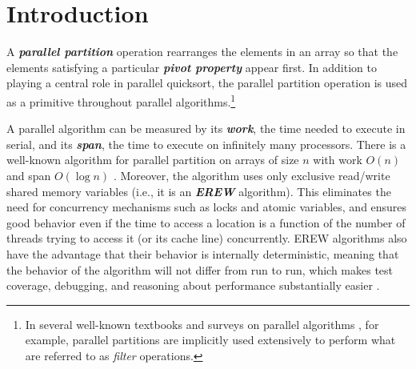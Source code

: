 \documentclass[sigplan, 10pt, nonacm]{acmart}
\newcommand{\defn}[1]{{\textit{\textbf{\boldmath #1}}}}
\theoremstyle{remark}
\theoremstyle{remark}
\begin{document}





%
%




\maketitle

\section{Introduction}

A \defn{parallel partition} operation rearranges the elements in an
array so that the elements satisfying a particular \defn{pivot
  property} appear first. In addition to playing a central role in
parallel quicksort, the parallel partition operation is used as a
primitive throughout parallel algorithms.\footnote{In several
  well-known textbooks and surveys on parallel algorithms
  \cite{AcarBl16,Blelloch96}, for example, parallel partitions are
  implicitly used extensively to perform what are referred to as
  \emph{filter} operations.}

A parallel algorithm can be measured by its \defn{work}, the time
needed to execute in serial, and its \defn{span}, the time to execute
on infinitely many processors. There is a well-known algorithm for
parallel partition on arrays of size $n$ with work $O(n)$ and span
$O(\log n)$ \cite{Blelloch96,AcarBl16}. Moreover, the algorithm uses
only exclusive read/write shared memory variables (i.e., it is an
\defn{EREW} algorithm). This eliminates the need for concurrency
mechanisms such as locks and atomic variables, and ensures good
behavior even if the time to access a location is a function of the
number of threads trying to access it (or its cache line)
concurrently. EREW algorithms also have the advantage that their
behavior is internally deterministic, meaning that
the behavior of the algorithm will not differ from run to run, which
makes test coverage, debugging, and reasoning about performance
substantially easier \cite{BlellochFi12}.
\end{document}
